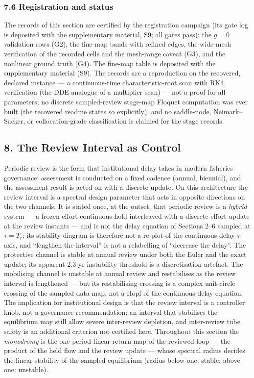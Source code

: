 \documentclass[11pt]{article}
\begin{document}
\subsubsection{7.6 Registration and
status}\label{registration-and-status}

The records of this section are certified by the registration campaign
(its gate log is deposited with the supplementary material, S9; all
gates pass): the \(g = 0\) validation rows (G2), the fine-map bands with
refined edges, the wide-mesh verification of the recorded cells and the
mesh-range caveat (G3), and the nonlinear ground truth (G4). The
fine-map table is deposited with the supplementary material (S9). The
records are a reproduction on the recovered, declared instance --- a
continuous-time characteristic-root scan with RK4 verification (the DDE
analogue of a multiplier scan) --- not a proof for all parameters; no
discrete sampled-review stage-map Floquet computation was ever built
(the recovered readme states so explicitly), and no saddle-node,
Neimark--Sacker, or collocation-grade classification is claimed for the
stage records.

\subsection{8. The Review Interval as
Control}\label{the-review-interval-as-control}

Periodic review is the form that institutional delay takes in modern
fisheries governance: assessment is conducted on a fixed cadence
(annual, biennial), and the assessment result is acted on with a
discrete update. On this architecture the review interval is a spectral
design parameter that acts in opposite directions on the two channels.
It is stated once, at the outset, that periodic review is a
\emph{hybrid} system --- a frozen-effort continuous hold interleaved
with a discrete effort update at the review instants --- and is not the
delay equation of Sections 2--6 sampled at \(\tau = T_r\); its stability
diagram is therefore not a re-plot of the continuous-delay
\(\tau\)-axis, and ``lengthen the interval'' is not a relabelling of
``decrease the delay''. The protective channel is stable at annual
review under both the Euler and the exact update; its apparent 2.3-yr
instability threshold is a discretisation artefact. The mobilising
channel is unstable at annual review and restabilises as the review
interval is lengthened --- but its restabilising crossing is a complex
unit-circle crossing of the sampled-data map, not a Hopf of the
continuous-delay equation. The implication for institutional design is
that the review interval is a controller knob, not a governance
recommendation; an interval that stabilises the equilibrium may still
allow severe inter-review depletion, and inter-review tube safety is an
additional criterion not certified here. Throughout this section the
\emph{monodromy} is the one-period linear return map of the reviewed
loop --- the product of the held flow and the review update --- whose
spectral radius decides the linear stability of the sampled equilibrium
(radius below one: stable; above one: unstable).
\end{document}
